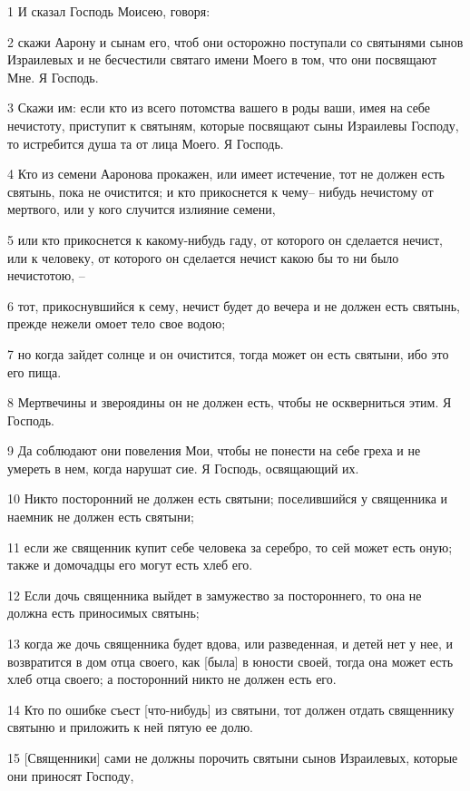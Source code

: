 \par 1 И сказал Господь Моисею, говоря:
\par 2 скажи Аарону и сынам его, чтоб они осторожно поступали со святынями сынов Израилевых и не бесчестили святаго имени Моего в том, что они посвящают Мне. Я Господь.
\par 3 Скажи им: если кто из всего потомства вашего в роды ваши, имея на себе нечистоту, приступит к святыням, которые посвящают сыны Израилевы Господу, то истребится душа та от лица Моего. Я Господь.
\par 4 Кто из семени Ааронова прокажен, или имеет истечение, тот не должен есть святынь, пока не очистится; и кто прикоснется к чему-- нибудь нечистому от мертвого, или у кого случится излияние семени,
\par 5 или кто прикоснется к какому-нибудь гаду, от которого он сделается нечист, или к человеку, от которого он сделается нечист какою бы то ни было нечистотою, --
\par 6 тот, прикоснувшийся к сему, нечист будет до вечера и не должен есть святынь, прежде нежели омоет тело свое водою;
\par 7 но когда зайдет солнце и он очистится, тогда может он есть святыни, ибо это его пища.
\par 8 Мертвечины и звероядины он не должен есть, чтобы не оскверниться этим. Я Господь.
\par 9 Да соблюдают они повеления Мои, чтобы не понести на себе греха и не умереть в нем, когда нарушат сие. Я Господь, освящающий их.
\par 10 Никто посторонний не должен есть святыни; поселившийся у священника и наемник не должен есть святыни;
\par 11 если же священник купит себе человека за серебро, то сей может есть оную; также и домочадцы его могут есть хлеб его.
\par 12 Если дочь священника выйдет в замужество за постороннего, то она не должна есть приносимых святынь;
\par 13 когда же дочь священника будет вдова, или разведенная, и детей нет у нее, и возвратится в дом отца своего, как [была] в юности своей, тогда она может есть хлеб отца своего; а посторонний никто не должен есть его.
\par 14 Кто по ошибке съест [что-нибудь] из святыни, тот должен отдать священнику святыню и приложить к ней пятую ее долю.
\par 15 [Священники] сами не должны порочить святыни сынов Израилевых, которые они приносят Господу,
